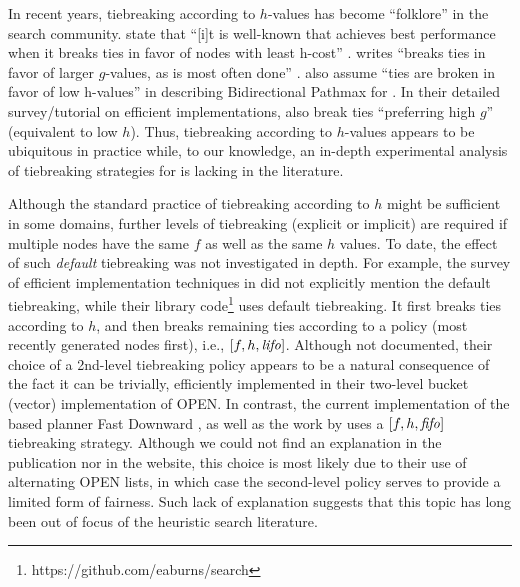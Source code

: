 In recent years, tiebreaking according to $h$-values has become ``folklore'' in the search community.
\citeauthor{hansen2007anytime} state that ``[i]t is well-known 
that \astar achieves best performance when it breaks ties
in favor of nodes with least h-cost'' \cite{hansen2007anytime}.
\citeauthor{holte2010common} writes ``\astar breaks ties in favor
of larger $g$-values, as is most often done'' \cite[note that since $f=g+h$,
preferring large $g$ is equivalent to preferring smaller $h$]{holte2010common}.
 also assume ``ties are broken in
favor of low h-values'' in describing Bidirectional Pathmax for \astar \citeyear{felner2011inconsistent}.
In their detailed survey/tutorial on efficient \astar implementations,
 \citeyear{burns2012implementing}
also break ties ``preferring high $g$'' (equivalent to low $h$).
Thus, tiebreaking according to $h$-values appears
to be ubiquitous in practice while,
to our knowledge, an in-depth experimental analysis of tiebreaking strategies for \astar is lacking in the literature.

Although the standard practice of tiebreaking according to $h$ might be
sufficient in some domains, further levels of tiebreaking (explicit or
implicit) are required if multiple nodes have the same $f$ as well as
the same $h$ values. To date, the effect of such \emph{default}
tiebreaking was not investigated in depth.
% 
For example, the survey of efficient \astar implementation techniques in
\cite{burns2012implementing} did not explicitly mention the default
tiebreaking, while their library
code\footnote{https://github.com/eaburns/search} uses \lifo
default tiebreaking.
% 
It first breaks ties according to $h$, and then
breaks remaining ties according to a \lifo policy (most recently
generated nodes first), i.e., $[f,h,{\text{\textit{lifo}}}]$.
% 
Although not documented, their choice of a \lifo 2nd-level tiebreaking
policy appears to be a natural consequence of the fact it can be
trivially, efficiently implemented in their two-level bucket (vector)
implementation of OPEN.
% 
In contrast, the current implementation of the \sota \astar based planner Fast
Downward \cite{Helmert2006}, as well as the work by \cite{RogerH10} uses
a $[f,h,{\text{\textit{fifo}}}]$ tiebreaking strategy.
% 
Although we could not find an explanation in the publication nor in the
website, this choice is most likely due to their use of alternating OPEN
lists, in which case the \fifo second-level policy serves to provide a
limited form of fairness.
% 
Such lack of explanation suggests that this topic has long been out
of focus of the heuristic search literature.
